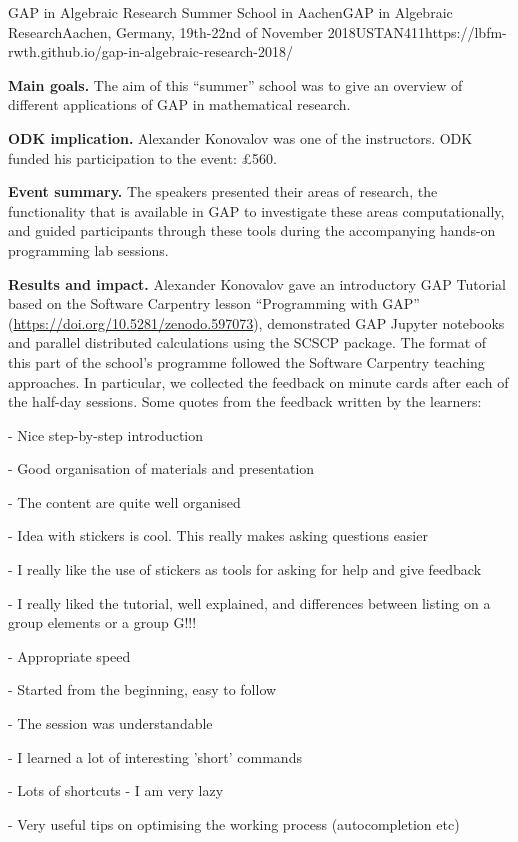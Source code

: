 \begin{event}{GAP in Algebraic Research Summer School in Aachen}{GAP in Algebraic Research}{Aachen, Germany, 19th-22nd of November 2018}{USTAN}{41}{1}{https://lbfm-rwth.github.io/gap-in-algebraic-research-2018/}

\textbf{Main goals.} The aim of this ``summer'' school was 
to give an overview of different applications of GAP in mathematical research. 

\textbf{ODK implication.} Alexander Konovalov was one of the instructors. 
ODK funded his participation to the event: \pounds 560.

\textbf{Event summary.} The speakers presented their areas of research, 
the functionality that is available in GAP to investigate these areas 
computationally, and guided participants through these tools during the 
accompanying hands-on programming lab sessions.

\textbf{Results and impact.} Alexander Konovalov
gave an introductory GAP Tutorial based on the 
Software Carpentry lesson ``Programming with GAP''
(\url{https://doi.org/10.5281/zenodo.597073}),
demonstrated GAP Jupyter notebooks and parallel 
distributed calculations using the SCSCP package.
The format of this part of the school's programme
followed the Software Carpentry teaching approaches.
In particular, we collected the feedback on minute
cards after each of the half-day sessions. Some quotes
from the feedback written by the learners:

- Nice step-by-step introduction

- Good organisation of materials and presentation

- The content are quite well organised 

- Idea with stickers is cool. This really makes asking questions easier

- I really like the use of stickers as tools for asking for help and give feedback

- I really liked the tutorial, well explained, and differences between listing on a group elements or a group G!!!

- Appropriate speed

- Started from the beginning, easy to follow

- The session was understandable

- I learned a lot of interesting 'short' commands

- Lots of shortcuts - I am very lazy

- Very useful tips on optimising the working process (autocompletion etc)


\end{event}
